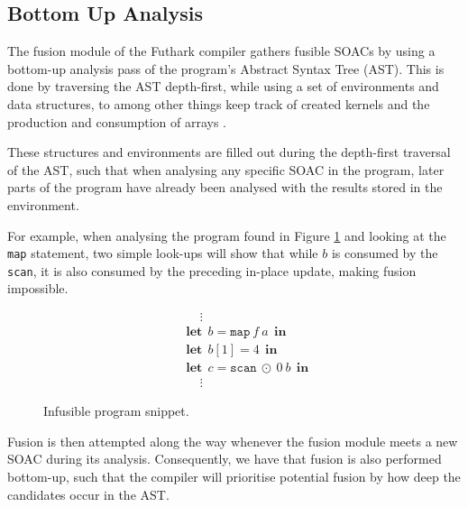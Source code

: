 \documentclass[11pt,bibliography=totocnumbered]{article}
\newcommand\lett{\phantom{-}\:\:\mathbf{let}\:\:}
\newcommand\inn{\:\:\mathbf{in}\:\:}
\begin{document}
\subsection{Bottom Up Analysis}
The fusion module of the Futhark compiler gathers fusible SOACs by using a bottom-up analysis pass of the program's Abstract Syntax Tree (AST). This is done by traversing the AST depth-first, while using a set
 of environments and data structures, to among other things keep track of created kernels and the production and consumption of arrays \cite{T2Fusion}.

These structures and environments are filled out during the depth-first traversal of the AST, such that when analysing any specific SOAC in the program, later parts of the program have already been analysed with the results stored in the environment.

For example, when analysing the program found in Figure \ref{fig:progsnip1} and looking at the \texttt{map} statement, two simple look-ups will show that while $b$ is consumed by the
 \texttt{scan}, it is also consumed by the preceding in-place update, making fusion impossible.
\begin{figure}[hb!]
  \centering
  \begin{mdframed}[style=alignbox]
  \begin{align*}
    &\phantom{---}\vdots\\
    &\lett b = \mathtt{map} \: f \: a \inn\\
    &\lett b[1] = 4 \inn\\
    &\lett c = \mathtt{scan} \: \odot \: 0 \: b \inn\\
    &\phantom{---}\vdots
  \end{align*}
\end{mdframed}

  \caption{Infusible program snippet.}
  \label{fig:progsnip1}
\end{figure}

Fusion is then attempted along the way whenever the fusion module meets a new SOAC during its analysis. Consequently, we have that fusion is also performed bottom-up, such that
 the compiler will prioritise potential fusion by how deep the candidates occur in the AST.
\end{document}

